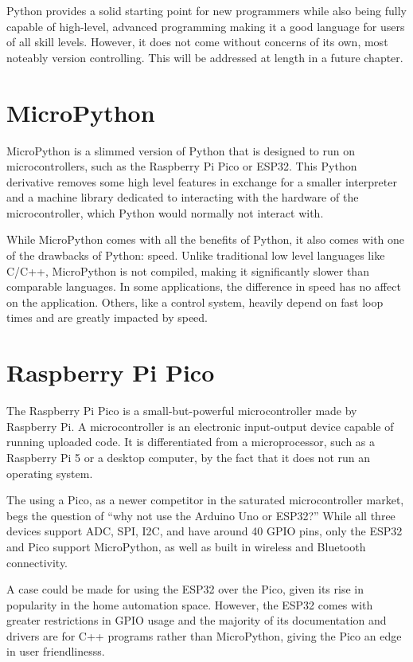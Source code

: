 Python provides a solid starting point for new programmers while also being fully capable of high-level,
advanced programming making it a good language for users of all skill levels. However, it does not come 
without concerns of its own, most noteably version controlling. This will be addressed at
length in a future chapter.

\section{MicroPython}

MicroPython is a slimmed version of Python that is designed to run on microcontrollers, such as the
Raspberry Pi Pico or ESP32. This Python derivative removes some high level features in exchange for
a smaller interpreter and a machine library dedicated to interacting with the hardware of the 
microcontroller, which Python would normally not interact with.

While MicroPython comes with all the benefits of Python, it also comes with one of the drawbacks
of Python: speed. Unlike traditional low level languages like C/C++, MicroPython is not compiled,
making it significantly slower than comparable languages. In some applications, the difference in
speed has no affect on the application. Others, like a control system, heavily depend on fast loop
times and are greatly impacted by speed.

\section{Raspberry Pi Pico}

The Raspberry Pi Pico is a small-but-powerful microcontroller made by Raspberry Pi. A microcontroller
is an electronic input-output device capable of running uploaded code. It is differentiated
from a microprocessor, such as a Raspberry Pi 5 or a desktop computer, by the fact that it does not run 
an operating system. 

The using a Pico, as a newer competitor in the saturated microcontroller market, begs the question of 
``why not use the Arduino Uno or ESP32?'' While all three devices support ADC, SPI, I2C, and have 
around 40 GPIO pins, only the ESP32 and Pico support MicroPython, as well as built in wireless and 
Bluetooth connectivity.

A case could be made for using the ESP32 over the Pico, given its rise in popularity in the home
automation space. However, the ESP32 comes with greater restrictions in GPIO usage and the majority
of its documentation and drivers are for C++ programs rather than MicroPython, giving the Pico an
edge in user friendlinesss.

